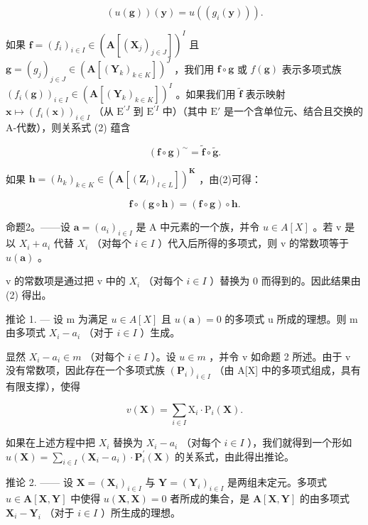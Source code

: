 \[
(u (\mathbf {g})) (\mathbf {y}) = u \left(\left(g _ {i} (\mathbf {y})\right)\right).\tag{2}
\]

如果 \(\mathbf{f} = (f_i)_{i\in I}\in (\mathbf{A}[(\mathbf{X}_j)_{j\in J}])^I\) 且 \(\mathbf{g} = (g_j)_{j\in J}\in (\mathbf{A}[(\mathbf{Y}_k)_{k\in K}])^J\) ，我们用 \(\mathbf{f}\circ \mathbf{g}\) 或 \(f(\mathbf{g})\) 表示多项式族 \((f_i(\mathbf{g}))_{i\in I}\in (\mathbf{A}[(\mathbf{Y}_k)_{k\in K}])^I\) 。如果我们用 \(\tilde{\mathbf{f}}\) 表示映射 \(\mathbf{x} \mapsto (f_i(\mathbf{x}))_{i \in I}\) （从 \(\mathrm{E}^{\prime J}\) 到 \(\mathrm{E}^{\prime I}\) 中）（其中 \(\mathrm{E}'\) 是一个含单位元、结合且交换的 A-代数），则关系式 (2) 蕴含

\[
(\mathbf {f} \circ \mathbf {g}) ^ {\sim} = \tilde {\mathbf {f}} \circ \tilde {\mathbf {g}}.\tag{3}
\]

如果 \(\mathbf{h} = (h_k)_{k\in K}\in (\mathbf{A}[(\mathbf{Z}_l)_{l\in L}])^{\mathbf{K}}\) ，由(2)可得：

\[
\mathbf {f} \circ (\mathbf {g} \circ \mathbf {h}) = (\mathbf {f} \circ \mathbf {g}) \circ \mathbf {h}.\tag{4}
\]

命题2。——设 \(\mathbf{a} = (a_i)_{i \in I}\) 是 A 中元素的一个族，并令 \(u \in A[X]\) 。若 v 是以 \(X_i + a_i\) 代替 \(X_i\) （对每个 \(i \in I\) ）代入后所得的多项式，则 v 的常数项等于 \(u(\mathbf{a})\) 。

v 的常数项是通过把 v 中的 \(X_{i}\) （对每个 \(i \in I\) ）替换为 0 而得到的。因此结果由 (2) 得出。

推论 1. --- 设 m 为满足 \(u \in A[X]\) 且 \(u(\mathbf{a}) = 0\) 的多项式 u 所成的理想。则 m 由多项式 \(X_{i} - a_{i}\) （对于 \(i \in I\) ）生成。

显然 \(X_{i} - a_{i} \in m\) （对每个 \(i \in I\) ）。设 \(u \in m\) ，并令 v 如命题 2 所述。由于 v 没有常数项，因此存在一个多项式族 \((\mathbf{P}_{i})_{i \in I}\) （由 A{[}X{]} 中的多项式组成，具有有限支撑），使得

\[
v (\mathbf {X}) = \sum_ {i \in I} \mathrm{X} _ {i} \cdot \mathrm{P} _ {i} (\mathbf {X}).
\]

如果在上述方程中把 \(X_{i}\) 替换为 \(X_{i}-a_{i}\) （对每个 \(i\in I\) ），我们就得到一个形如 \(u(\mathbf{X})=\sum_{i\in I}\left(\mathbf{X}_{i}-a_{i}\right)\cdot\mathbf{P}_{i}^{\prime}(\mathbf{X})\) 的关系式，由此得出推论。

推论 2. —— 设 \(\mathbf{X} = (\mathbf{X}_i)_{i \in I}\) 与 \(\mathbf{Y} = (\mathbf{Y}_i)_{i \in I}\) 是两组未定元。多项式 \(u \in \mathbf{A}[\mathbf{X}, \mathbf{Y}]\) 中使得 \(u(\mathbf{X}, \mathbf{X}) = 0\) 者所成的集合，是 \(\mathbf{A}[\mathbf{X}, \mathbf{Y}]\) 的由多项式 \(\mathbf{X}_i - \mathbf{Y}_i\) （对于 \(i \in I\) ）所生成的理想。

